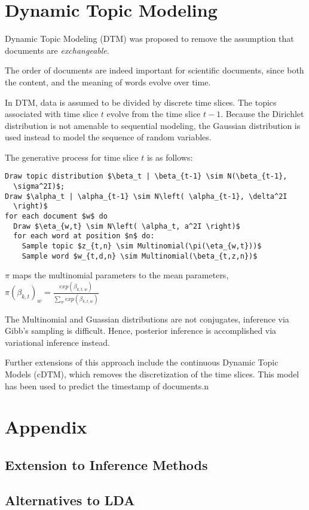 \documentclass[letterpaper]{article}
\begin{document}
\section{Dynamic Topic Modeling}
\label{sec:dtm}
Dynamic Topic Modeling (DTM) was proposed to remove the assumption
that documents are \textit{exchangeable}. \citep{blei2006dynamic}

The order of documents are indeed important for scientific documents,
since both the content, and the meaning of words evolve over time.

In DTM, data is assumed to be divided by discrete time slices. The
topics associated with time slice $t$ evolve from the time slice
$t-1$. Because the Dirichlet distribution is not amenable to
sequential modeling, the Gaussian distribution is used instead to
model the sequence of random variables.

The generative process for time slice $t$ is as follows:

\begin{lstlisting}[mathescape=true]
Draw topic distribution $\beta_t | \beta_{t-1} \sim N(\beta_{t-1},
  \sigma^2I)$;
Draw $\alpha_t | \alpha_{t-1} \sim N\left( \alpha_{t-1}, \delta^2I
  \right)$
for each document $w$ do
  Draw $\eta_{w,t} \sim N\left( \alpha_t, a^2I \right)$
  for each word at position $n$ do:
    Sample topic $z_{t,n} \sim Multinomial(\pi(\eta_{w,t}))$
    Sample word $w_{t,d,n} \sim Multinomial(\beta_{t,z,n})$
\end{lstlisting}

$\pi$ maps the multinomial parameters to the mean parameters,
$\pi\left( \beta_{k,t} \right)_w = \frac{exp(\beta_{k,t,w})}{\sum_w exp\left( \beta_{k,t,w} \right)}$

The Multinomial and Guassian distributions are not conjugates,
inference via Gibb's sampling is difficult. Hence, posterior
inference is accomplished via variational inference instead.

Further extensions of this approach include the continuous Dynamic
Topic Models (cDTM), which removes the discretization of the time
slices. \citep{wang-2012-contin-time} This model has been used to
predict the timestamp of documents.n

\section{Appendix}
\subsection{Extension to Inference Methods}
\label{sub:ext:inference}

\subsection{Alternatives to LDA}


\end{document}
